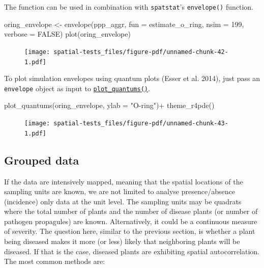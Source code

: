 \documentclass[
  letterpaper,
]{book}
\newenvironment{Shaded}{\begin{snugshade}}{\end{snugshade}}
\newcommand{\AttributeTok}[1]{\textcolor[rgb]{0.40,0.45,0.13}{#1}}
\newcommand{\ConstantTok}[1]{\textcolor[rgb]{0.56,0.35,0.01}{#1}}
\newcommand{\DecValTok}[1]{\textcolor[rgb]{0.68,0.00,0.00}{#1}}
\newcommand{\FunctionTok}[1]{\textcolor[rgb]{0.28,0.35,0.67}{#1}}
\newcommand{\NormalTok}[1]{\textcolor[rgb]{0.00,0.23,0.31}{#1}}
\newcommand{\OtherTok}[1]{\textcolor[rgb]{0.00,0.23,0.31}{#1}}
\newcommand{\SpecialCharTok}[1]{\textcolor[rgb]{0.37,0.37,0.37}{#1}}
\newcommand{\StringTok}[1]{\textcolor[rgb]{0.13,0.47,0.30}{#1}}
\begin{document}
The function can be used in combination with \texttt{spatstat}'s
\texttt{envelope()} function.

\begin{Shaded}
\begin{Highlighting}[]
\NormalTok{oring\_envelope }\OtherTok{\textless{}{-}} \FunctionTok{envelope}\NormalTok{(ppp\_aggr, }\AttributeTok{fun =}\NormalTok{ estimate\_o\_ring, }\AttributeTok{nsim =} \DecValTok{199}\NormalTok{, }\AttributeTok{verbose =} \ConstantTok{FALSE}\NormalTok{)}
\FunctionTok{plot}\NormalTok{(oring\_envelope)}
\end{Highlighting}
\end{Shaded}

\begin{figure}[H]

\texttt{[image: spatial-tests\_files/figure-pdf/unnamed-chunk-42-1.pdf]} \hfill{}

\end{figure}

To plot simulation envelopes using quantum plots (Esser et al. 2014),
just pass an \texttt{envelope} object as input to
\href{https://r-spatialecology.github.io/onpoint/reference/plot_quantums.html}{\texttt{plot\_quantums()}}.

\begin{Shaded}
\begin{Highlighting}[]
\FunctionTok{plot\_quantums}\NormalTok{(oring\_envelope, }\AttributeTok{ylab =} \StringTok{"O{-}ring"}\NormalTok{)}\SpecialCharTok{+}
  \FunctionTok{theme\_r4pde}\NormalTok{()}
\end{Highlighting}
\end{Shaded}

\begin{figure}[H]

\texttt{[image: spatial-tests\_files/figure-pdf/unnamed-chunk-43-1.pdf]} \hfill{}

\end{figure}

\hypertarget{grouped-data}{%
\subsection{Grouped data}\label{grouped-data}}

If the data are intensively mapped, meaning that the spatial locations
of the sampling units are known, we are not limited to analyse
presence/absence (incidence) only data at the unit level. The sampling
units may be quadrats where the total number of plants and the number of
disease plants (or number of pathogen propagules) are known.
Alternatively, it could be a continuous measure of severity. The
question here, similar to the previous section, is whether a plant being
diseased makes it more (or less) likely that neighboring plants will be
diseased. If that is the case, diseased plants are exhibiting spatial
autocorrelation. The most common methods are:
\end{document}
